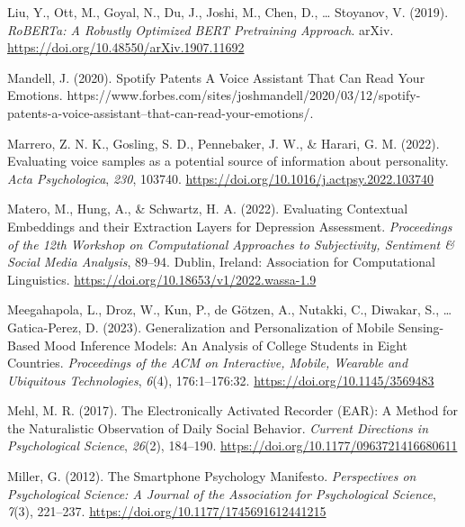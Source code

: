 \documentclass[
  man,floatsintext]{apa6}
\newlength{\cslhangindent}
\newlength{\cslentryspacingunit} %
\newenvironment{CSLReferences}[2] %
 {%
  \setlength{\parindent}{0pt}
  \ifodd #1
  \let\oldpar\par
  \def\par{\hangindent=\cslhangindent\oldpar}
  \fi
  \setlength{\parskip}{#2\cslentryspacingunit}
 }%
 {}
\begin{document}
\begin{CSLReferences}{1}{0}
\leavevmode{}%
Liu, Y., Ott, M., Goyal, N., Du, J., Joshi, M., Chen, D., \ldots{} Stoyanov, V. (2019). \emph{{RoBERTa}: {A Robustly Optimized BERT Pretraining Approach}}. {arXiv}. \url{https://doi.org/10.48550/arXiv.1907.11692}

\leavevmode{}%
Mandell, J. (2020). Spotify {Patents A Voice Assistant That Can Read Your Emotions}. https://www.forbes.com/sites/joshmandell/2020/03/12/spotify-patents-a-voice-assistant--that-can-read-your-emotions/.

\leavevmode{}%
Marrero, Z. N. K., Gosling, S. D., Pennebaker, J. W., \& Harari, G. M. (2022). Evaluating voice samples as a potential source of information about personality. \emph{Acta Psychologica}, \emph{230}, 103740. \url{https://doi.org/10.1016/j.actpsy.2022.103740}

\leavevmode{}%
Matero, M., Hung, A., \& Schwartz, H. A. (2022). Evaluating {Contextual Embeddings} and their {Extraction Layers} for {Depression Assessment}. \emph{Proceedings of the 12th {Workshop} on {Computational Approaches} to {Subjectivity}, {Sentiment} \& {Social Media Analysis}}, 89--94. {Dublin, Ireland}: {Association for Computational Linguistics}. \url{https://doi.org/10.18653/v1/2022.wassa-1.9}

\leavevmode{}%
Meegahapola, L., Droz, W., Kun, P., de Götzen, A., Nutakki, C., Diwakar, S., \ldots{} Gatica-Perez, D. (2023). Generalization and {Personalization} of {Mobile Sensing-Based Mood Inference Models}: {An Analysis} of {College Students} in {Eight Countries}. \emph{Proceedings of the ACM on Interactive, Mobile, Wearable and Ubiquitous Technologies}, \emph{6}(4), 176:1--176:32. \url{https://doi.org/10.1145/3569483}

\leavevmode{}%
Mehl, M. R. (2017). The {Electronically Activated Recorder} ({EAR}): {A Method} for the {Naturalistic Observation} of {Daily Social Behavior}. \emph{Current Directions in Psychological Science}, \emph{26}(2), 184--190. \url{https://doi.org/10.1177/0963721416680611}

\leavevmode{}%
Miller, G. (2012). The {Smartphone Psychology Manifesto}. \emph{Perspectives on Psychological Science: A Journal of the Association for Psychological Science}, \emph{7}(3), 221--237. \url{https://doi.org/10.1177/1745691612441215}


\end{CSLReferences}
\end{document}
